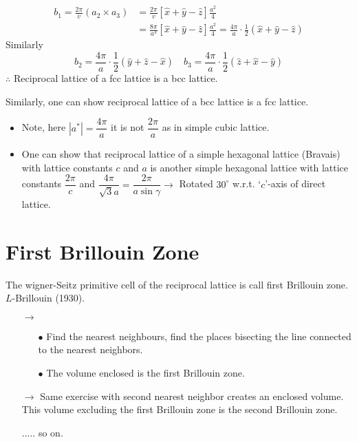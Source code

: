 \begin{align*}
b_{1} = \frac{2\pi}{v}(a_{2}\times a_{3}) &=\frac{2\pi}{v}[\widehat{x}+\widehat{y}-\widehat{z}]\frac{a^{2}}{4}\\
&= \frac{8\pi}{a^{3}}[\widehat{x}+\widehat{y}-\widehat{z}]\frac{a^{2}}{4}=\frac{4\pi}{a}\cdot\frac{1}{2}(\widehat{x}+\widehat{y}-\widehat{z})
\end{align*}
Similarly 
$$
b_{2}=\frac{4\pi}{a}\cdot \frac{1}{2}(\widehat{y}+\widehat{z}-\widehat{x})\quad b_{3}=\frac{4\pi}{a}\cdot \frac{1}{2}(\widehat{z}+\widehat{x}-\widehat{y})
$$
$\therefore$ Reciprocal lattice of a fcc lattice is a bcc lattice.

Similarly, one can show reciprocal lattice of a bcc lattice is a fcc lattice.
\begin{itemize}
\item Note, here $|a^{*}|=\dfrac{4\pi}{a}$ it is not $\dfrac{2\pi}{a}$ as in simple cubic lattice.

\item One can show that reciprocal lattice of a simple hexagonal lattice (Bravais) with lattice constants $c$ and $a$ is another simple hexagonal lattice with lattice constants $\dfrac{2\pi}{c}$ and $\dfrac{4\pi}{\sqrt{3}a}=\dfrac{2\pi}{a\sin \gamma}\to$ Rotated $30^{\circ}$ w.r.t. `$c$'-axis of direct lattice.
\end{itemize}

\section*{First Brillouin Zone}

The wigner-Seitz primitive cell of the reciprocal lattice is call first Brillouin zone. $L$-Brillouin (1930).
\begin{itemize}
\item[$\to$] 
\begin{itemize}
\item[$\bullet$] Find the nearest neighbours, find the places bisecting the line connected to the nearest neighbors.

\item[$\bullet$] The volume enclosed is the first Brillouin zone.
\end{itemize}
\item[$\to$] Same exercise with second nearest neighbor creates an enclosed volume. This volume excluding the first Brillouin zone is the second Brillouin zone.

..... so on.
\end{itemize}

